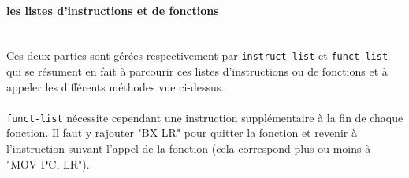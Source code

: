 \documentclass[a4paper,10pt]{article}
\begin{document}
			\paragraph{les listes d'instructions et de fonctions}\label{instruct-list}~\\
				Ces deux parties sont gérées respectivement par \verb?instruct-list? et \verb?funct-list? qui se résument en fait à parcourir ces listes d'instructions ou de fonctions et à appeler les différents méthodes vue ci-dessus.\\
				~\\
				\verb?funct-list? nécessite cependant une instruction supplémentaire à la fin de chaque fonction. Il faut y rajouter "BX	LR" pour quitter la fonction et revenir à l'instruction suivant l'appel de la fonction (cela correspond plus ou moins à "MOV		PC, LR").
\end{document}
